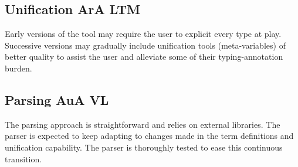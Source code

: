 \documentclass[twocolumn]{article}
\newcommand{\members}[1]{\texorpdfstring{\hfill\scriptsize #1}{}}
\begin{document}
\subsection{Unification \members{ArA LTM}}
Early versions of the tool may require the user to explicit every type at play.
Successive versions may gradually include unification tools (meta-variables)
of better quality to assist the user and alleviate some of their typing-annotation
burden.


\subsection{Parsing \members{AuA VL}}
The parsing approach is straightforward and relies on external libraries. The
parser is expected to keep adapting to changes made in the term definitions and
unification capability. The parser is thoroughly tested to ease this continuous transition.

\end{document}

